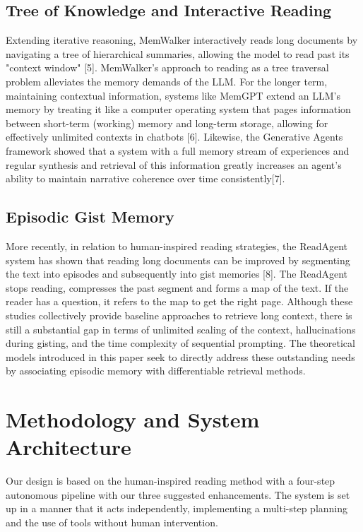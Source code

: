 \documentclass[conference]{IEEEtran}
\begin{document}
\subsection{Tree of Knowledge and Interactive Reading}
Extending iterative reasoning, MemWalker interactively reads long documents by navigating a tree of hierarchical summaries, allowing the model to read past its "context window" [5]. MemWalker's approach to reading as a tree traversal problem alleviates the memory demands of the LLM. For the longer term, maintaining contextual information, systems like MemGPT extend an LLM's memory by treating it like a computer operating system that pages information between short-term (working) memory and long-term storage, allowing for effectively unlimited contexts in chatbots [6]. Likewise, the Generative Agents framework showed that a system with a full memory stream of experiences and regular synthesis and retrieval of this information greatly increases an agent's ability to maintain narrative coherence over time consistently[7].

\subsection{Episodic Gist Memory}
More recently, in relation to human-inspired reading strategies, the ReadAgent system has shown that reading long documents can be improved by segmenting the text into episodes and subsequently into gist memories [8]. The ReadAgent stops reading, compresses the past segment and forms a map of the text. If the reader has a question, it refers to the map to get the right page. Although these studies collectively provide baseline approaches to retrieve long context, there is still a substantial gap in terms of unlimited scaling of the context, hallucinations during gisting, and the time complexity of sequential prompting. The theoretical models introduced in this paper seek to directly address these outstanding needs by associating episodic memory with differentiable retrieval methods.

\section{Methodology and System Architecture}
Our design is based on the human-inspired reading method with a four-step autonomous pipeline with our three suggested enhancements. The system is set up in a manner that it acts independently, implementing a multi-step planning and the use of tools without human intervention.
\end{document}
